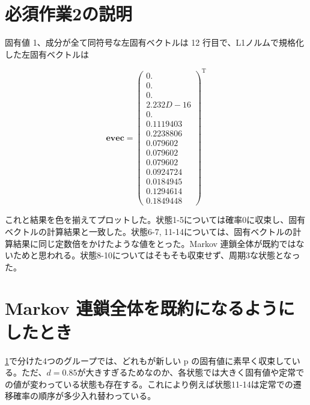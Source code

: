 \documentclass[a4paper,twoside]{jarticle}
\begin{document}

\maketitle

\section{必須作業2の説明}\label{sec1}

固有値 1、成分が全て同符号な左固有ベクトルは 12 行目で、L1ノルムで規格化した左固有ベクトルは

\[
  \bm{\textrm{evec}} = \left(
    \begin{array}{c}
      0. \\
      0. \\
      0. \\
      2.232D-16 \\
      0. \\
      0.1119403 \\
      0.2238806 \\
      0.079602 \\
      0.079602 \\
      0.079602 \\
      0.0924724 \\
      0.0184945 \\
      0.1294614 \\
      0.1849448
    \end{array}
  \right)^{\mathrm{T}}
\]

これと結果を色を揃えてプロットした。状態1-5については確率0に収束し、固有ベクトルの計算結果と一致した。状態6-7, 11-14については、固有ベクトルの計算結果に同じ定数倍をかけたような値をとった。Markov 連鎖全体が既約ではないためと思われる。状態8-10についてはそもそも収束せず、周期3な状態となった。

\section{Markov 連鎖全体を既約になるようにしたとき}

\ref{sec1}で分けた4つのグループでは、どれもが新しい p の固有値に素早く収束している。ただ、$d=0.85$が大きすぎるためなのか、各状態では大きく固有値や定常での値が変わっている状態も存在する。これにより例えば状態11-14は定常での遷移確率の順序が多少入れ替わっている。
\end{document}
